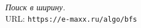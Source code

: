 \begin{thebibliography}{99}
{\itshape Поиск в ширину.}
\\URL: \texttt{https://e-maxx.ru/algo/bfs}
\end{thebibliography}
\pagebreak

